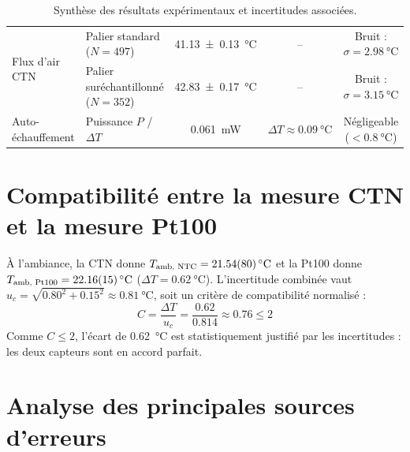 \begin{table}[H]
\begin{tabularx}{\textwidth}{l >{\raggedright\arraybackslash}X c c c}
    \midrule
    \multirow{2}{*}{Flux d'air CTN} & Palier standard ($N=497$) & \qty{41.13 \pm 0.13}{\degreeCelsius} & -- & Bruit : $\sigma = \qty{2.98}{\degreeCelsius}$ \\
     & Palier suréchantillonné ($N=352$) & \qty{42.83 \pm 0.17}{\degreeCelsius} & -- & Bruit : $\sigma = \qty{3.15}{\degreeCelsius}$ \\
    \midrule
    Auto-échauffement & Puissance $P$ / $\Delta T$ & \qty{0.061}{\milli\watt} & $\Delta T \approx \qty{0.09}{\degreeCelsius}$ & Négligeable ($< \qty{0.8}{\degreeCelsius}$) \\
    \bottomrule
  \end{tabularx}
  \caption{Synthèse des résultats expérimentaux et incertitudes associées.}
  \label{tab:recap-labo}
\end{table}

\vspace{-10pt}
\section{Compatibilité entre la mesure CTN et la mesure Pt100}
\label{sec:compatibilite}

À l'ambiance, la CTN donne $T_{\text{amb, NTC}} = \qty{21.54 \pm 0.80}{\degreeCelsius}$ et la Pt100 donne $T_{\text{amb, Pt100}} = \qty{22.16 \pm 0.15}{\degreeCelsius}$ ($\Delta T = \qty{0.62}{\degreeCelsius}$). L'incertitude combinée vaut $u_c = \sqrt{0.80^2 + 0.15^2} \approx \qty{0.81}{\degreeCelsius}$, soit un critère de compatibilité normalisé :
\begin{equation}
    C = \frac{\Delta T}{u_c} = \frac{0.62}{0.814} \approx \mathbf{0.76} \le 2
\end{equation}
Comme $C \le 2$, l'écart de \qty{0.62}{\degreeCelsius} est statistiquement justifié par les incertitudes : les deux capteurs sont en accord parfait.

\vspace{-4pt}
\section{Analyse des principales sources d'erreurs}
\label{sec:sources_erreurs}

